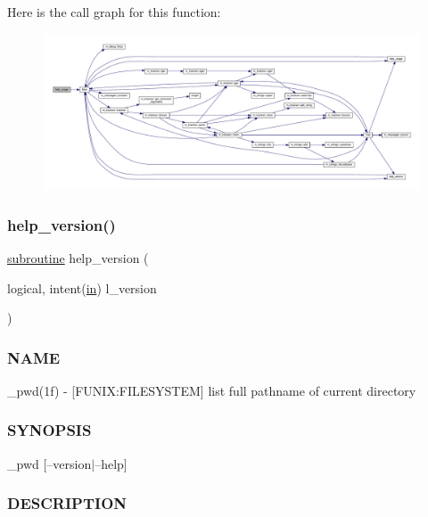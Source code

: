 Here is the call graph for this function\+:
\nopagebreak
\begin{figure}[H]
\begin{center}
\leavevmode
\includegraphics[width=350pt]{__pwd_8f90_a3e09a3b52ee8fb04eeb93fe5761626a8_cgraph}
\end{center}
\end{figure}
\mbox{\label{__pwd_8f90_a39c21619b08a3c22f19e2306efd7f766}} 
\subsubsection{\texorpdfstring{help\+\_\+version()}{help\_version()}}
{\footnotesize\ttfamily \hyperlink{M__stopwatch_83_8txt_acfbcff50169d691ff02d4a123ed70482}{subroutine} help\+\_\+version (\begin{DoxyParamCaption}\item[{logical, intent(\hyperlink{M__journal_83_8txt_afce72651d1eed785a2132bee863b2f38}{in})}]{l\+\_\+version }\end{DoxyParamCaption})}



\subsubsection*{N\+A\+ME}

\+\_\+pwd(1f) -\/ \mbox{[}F\+U\+N\+IX\+:F\+I\+L\+E\+S\+Y\+S\+T\+EM\mbox{]} list full pathname of current directory \subsubsection*{S\+Y\+N\+O\+P\+S\+IS}

\+\_\+pwd \mbox{[}--version$\vert$--help\mbox{]} \subsubsection*{D\+E\+S\+C\+R\+I\+P\+T\+I\+ON}

